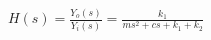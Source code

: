 \documentclass[preview]{standalone}
\begin{document}
\begin{align*}
H(s) = \frac{Y_o(s)}{Y_i(s)} = \frac{k_1}{ms^2 + cs + k_1 + k_2}
\end{align*}
\end{document}
